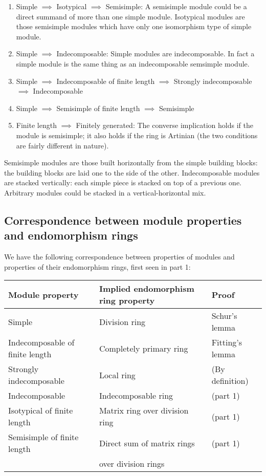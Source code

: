 \documentclass[a4paper]{amsart}
\begin{document}
\begin{enumerate}

\item Simple $\implies$ Isotypical $\implies$ Semisimple: A semisimple
  module could be a direct summand of more than one simple
  module. Isotypical modules are those semisimple modules which have
  only one isomorphism type of simple module.

\item Simple $\implies$ Indecomposable: Simple modules are
  indecomposable. In fact a simple module is the same thing as an
  indecomposable semsimple module.

\item Simple $\implies$ Indecomposable of finite length $\implies$
  Strongly indecomposable $\implies$ Indecomposable

\item Simple $\implies$ Semisimple of finite length $\implies$ Semisimple

\item Finite length $\implies$ Finitely generated: The converse
  implication holds if the module is semisimple; it also holds if the
  ring is Artinian (the two conditions are fairly different in
  nature).

\end{enumerate}

Semisimple modules are those built horizontally from the
simple building blocks: the building blocks are laid one to the side
of the other. Indecomposable modules are stacked vertically: each
simple piece is stacked on top of a previous one. Arbitrary modules
could be stacked in a vertical-horizontal mix.

\subsection{Correspondence between module properties and endomorphism
  rings}

We have the following correspondence between properties of modules and
properties of their endomorphism rings, first seen in part 1:

\begin{tabular}{|l|l|l|}
  \hline
  Module property & Implied endomorphism ring property & Proof\\
  \hline
  Simple & Division ring & Schur's lemma\\
  Indecomposable of finite length & Completely primary ring & Fitting's lemma\\
  Strongly indecomposable & Local ring & (By definition)\\
  Indecomposable & Indecomposable ring & (part 1)\\
  Isotypical of finite length & Matrix ring over division ring & (part 1)\\
  Semisimple of finite length & Direct sum of matrix rings & (part 1)\\
  & over division rings & \\
  \hline
\end{tabular}
\end{document}
